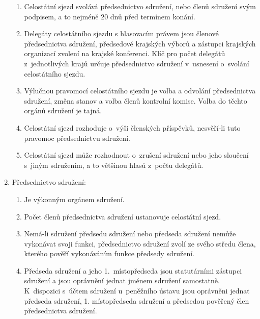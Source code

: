 \documentclass[a4paper]{article}
\begin{document}
\begin{enumerate}
\begin{enumerate}
        \item Celostátní sjezd svolává předsednictvo sdružení, nebo  členů
            sdružení svým podpisem, a to nejméně 20 dnů před termínem konání.

        \item Delegáty celostátního sjezdu s hlasovacím právem jsou členové
            předsednictva sdružení, předsedové krajských výborů a zástupci
            krajských organizací zvolení na krajské konferenci. Klíč pro počet
            delegátů z~jednotlivých krajů určuje předsednictvo sdružení
            v~usnesení o~svolání celostátního sjezdu.

        \item Výlučnou pravomocí celostátního sjezdu je volba a odvolání
            předsednictva sdružení, změna stanov a volba členů
            kontrolní komise. Volba do těchto orgánů sdružení je tajná.

        \item Celostátní sjezd rozhoduje o~výši členských příspěvků,
            nesvěří-li tuto pravomoc předsednictvu sdružení.

        \item Celostátní sjezd může rozhodnout o~zrušení sdružení nebo jeho
            sloučení s~jiným sdružením, a to  většinou hlasů
            z~počtu delegátů.
        \end{enumerate}

    \item Předsednictvo sdružení:
        \begin{enumerate}
        \item Je výkonným orgánem sdružení.

        \item Počet členů předsednictva sdružení ustanovuje celostátní sjezd.

        \item Nemá-li sdružení předsedu sdružení nebo předseda sdružení nemůže
            vykonávat svoji funkci, předsednictvo sdružení zvolí ze svého
            středu člena, kterého pověří vykonáváním funkce předsedy sdružení.

        \item Předseda sdružení a jeho 1.~místopředseda jsou statutárními
            zástupci sdružení a jsou oprávnění jednat jménem sdružení
            samostatně. K~dispozici s~účtem sdružení u~peněžního ústavu jsou
            oprávněni jednat předseda sdružení, 1. místopředseda sdružení a
            předsedou pověřený člen předsednictva sdružení.


\end{enumerate}
\end{enumerate}
\end{document}
